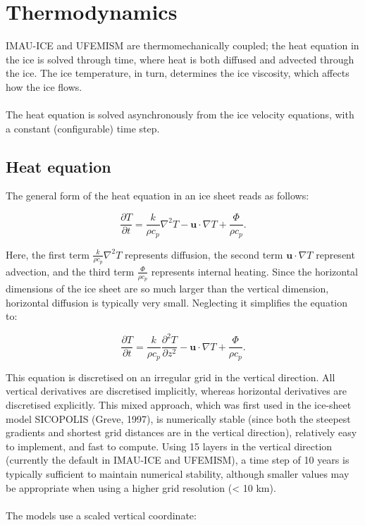 \documentclass{article}
\begin{document}
\newpage
\section{Thermodynamics}

IMAU-ICE and UFEMISM are thermomechanically coupled; the heat equation in the ice is solved through time, where heat is both diffused and advected through the ice. The ice temperature, in turn, determines the ice viscosity, which affects how the ice flows.\\
\\
The heat equation is solved asynchronously from the ice velocity equations, with a constant (configurable) time step.

\subsection{Heat equation}

The general form of the heat equation in an ice sheet reads as follows:

\begin{equation}
\frac{\partial T}{\partial t} = \frac{k}{\rho c_p} \nabla^2 T - \mathbf{u} \cdot \nabla T + \frac{\Phi}{\rho c_p}.
\end{equation}

Here, the first term $\frac{k}{\rho c_p} \nabla^2 T$ represents diffusion, the second term $\mathbf{u} \cdot \nabla T$ represent advection, and the third term $\frac{\Phi}{\rho c_p}$ represents internal heating. Since the horizontal dimensions of the ice sheet are so much larger than the vertical dimension, horizontal diffusion is typically very small. Neglecting it simplifies the equation to:

\begin{equation}
\frac{\partial T}{\partial t} = \frac{k}{\rho c_p} \frac{\partial^2 T}{\partial z^2} - \mathbf{u} \cdot \nabla T + \frac{\Phi}{\rho c_p}.
\end{equation}

This equation is discretised on an irregular grid in the vertical direction. All vertical derivatives are discretised implicitly, whereas horizontal derivatives are discretised explicitly. This mixed approach, which was first used in the ice-sheet model SICOPOLIS (Greve, 1997), is numerically stable (since both the steepest gradients and shortest grid distances are in the vertical direction), relatively easy to implement, and fast to compute. Using 15 layers in the vertical direction (currently the default in IMAU-ICE and UFEMISM), a time step of 10 years is typically sufficient to maintain numerical stability, although smaller values may be appropriate when using a higher grid resolution (< 10 km).\\
\\
The models use a scaled vertical coordinate:
\end{document}
